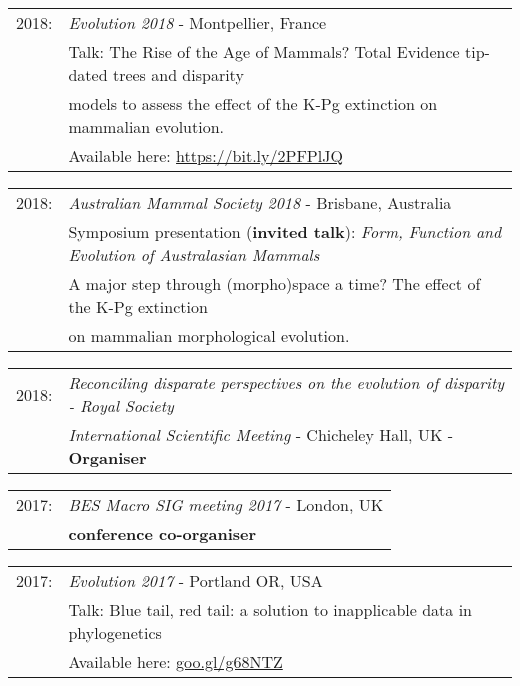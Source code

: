 \documentclass[10pt,a4paper]{article}
\begin{document}
{\begin{tabular}{ll}
2018: & \textit{Evolution 2018} - Montpellier, France\\
      & Talk: The Rise of the Age of Mammals? Total Evidence tip-dated trees and disparity\\
      & models to assess the effect of the K-Pg extinction on mammalian evolution.\\
      & Available here: \href{https://figshare.com/articles/Evolution_2018_Talk/6983210}{https://bit.ly/2PFPlJQ}\\
\end{tabular}
\begin{tabular}{ll}
2018: & \textit{Australian Mammal Society 2018} - Brisbane, Australia\\
      & Symposium presentation (\textbf{invited talk}): \textit{Form, Function and Evolution of Australasian Mammals}\\ 
      & A major step through (morpho)space a time? The effect of the K-Pg extinction\\
      & on mammalian morphological evolution.\\
\end{tabular}
\begin{tabular}{ll}
2018: & \textit{Reconciling disparate perspectives on the evolution of disparity - Royal Society}\\
      & \textit{International Scientific Meeting} - Chicheley Hall, UK - \textbf{Organiser}\\
\end{tabular}
\begin{tabular}{ll}
2017: & \textit{BES Macro SIG meeting 2017} - London, UK\\
      & \textbf{conference co-organiser}\\
\end{tabular}
\begin{tabular}{ll}
2017: & \textit{Evolution 2017} - Portland OR, USA\\
      & Talk: Blue tail, red tail: a solution to inapplicable data in phylogenetics\\
      & Available here: \href{https://figshare.com/articles/Guillerme_Evolution2017_pdf/5140222}{goo.gl/g68NTZ}\\
\end{tabular}
}
\end{document}
